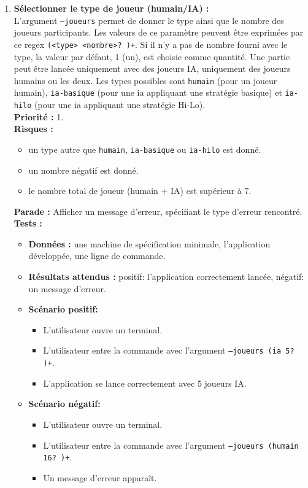 \documentclass{article}
\newcommand{\code}[1]{\colorbox{light-gray}{\texttt{#1}}}
\begin{document}
\begin{enumerate}
    \item \textbf{Sélectionner le type de joueur (humain/IA) :} \\
    L'argument \code{--joueurs} permet de donner le type ainsi que le nombre des joueurs participants. Les valeurs de ce paramètre peuvent être exprimées par ce regex \code{(<type> <nombre>? )+}. Si il n'y a pas de nombre fourni avec le type, la valeur par défaut, 1 (un), est choisie comme quantité. Une partie peut être lancée uniquement avec des joueurs IA, uniquement des joueurs humains ou les deux.
    Les types possibles sont \code{humain} (pour un joueur humain), \code{ia-basique} (pour une ia appliquant une stratégie basique) et \code{ia-hilo} (pour une ia appliquant une stratégie Hi-Lo). \\
    \textbf{Priorité :} 1. \\
    \textbf{Risques :}
    \begin{itemize}
        \item un type autre que \code{humain}, \code{ia-basique} ou \code{ia-hilo} est donné.
        \item un nombre négatif est donné.
        \item le nombre total de joueur (humain + IA) est supérieur à 7.
    \end{itemize}
    \textbf{Parade :} Afficher un message d'erreur, spécifiant le type d'erreur rencontré.\\
    \textbf{Tests :}
    \begin{itemize}
        \item \textbf{Données :} une machine de spécification minimale, l'application développée, une ligne de commande.
        \item \textbf{Résultats attendus :} positif: l'application correctement lancée, négatif: un message d'erreur.
        \item \textbf{Scénario positif:}
        \begin{itemize}
            \item L’utilisateur ouvre un terminal.
            \item L’utilisateur entre la commande avec l'argument \code{--joueurs (ia 5? )+}.
            \item L'application se lance correctement avec 5 joueurs IA.
        \end{itemize}
        \item \textbf{Scénario négatif:}
        \begin{itemize}
            \item L’utilisateur ouvre un terminal.
            \item L’utilisateur entre la commande avec l'argument \code{--joueurs (humain 16? )+}.
            \item Un message d'erreur apparaît.
        \end{itemize}
    \end{itemize}


\end{enumerate}
\end{document}
